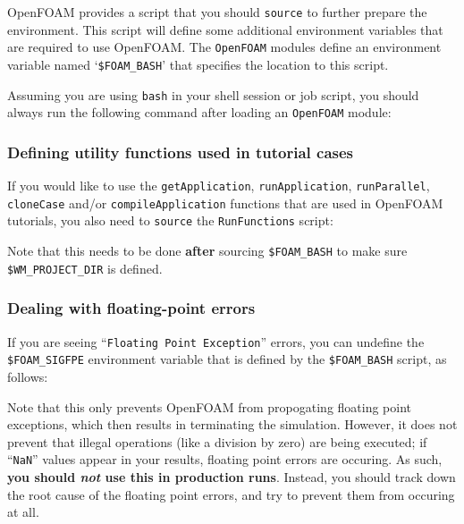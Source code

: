 OpenFOAM provides a script that you should \texttt{\small{source}} to further prepare the environment.
This script will define some additional environment variables that are required to use OpenFOAM.
The {\small\texttt{OpenFOAM}} modules define an environment variable named `\texttt{\small\$FOAM\_BASH}'
that specifies the location to this script.

Assuming you are using \texttt{\small{bash}} in your shell session or job script,
you should always run the following command after loading an \texttt{\small{OpenFOAM}} module:

\begin{prompt}
\end{prompt}


\subsubsection{Defining utility functions used in tutorial cases}

If you would like to use the \texttt{\small{getApplication}}, \texttt{\small{runApplication}},
\texttt{\small{runParallel}}, \texttt{\small{cloneCase}} and/or \texttt{\small{compileApplication}} functions that are
used in OpenFOAM tutorials, you also need to \texttt{\small{source}} the \texttt{\small{RunFunctions}} script:

\begin{prompt}
\end{prompt}

Note that this needs to be done \textbf{after} sourcing \texttt{\small{\$FOAM\_BASH}} to make sure
\texttt{\small{\$WM\_PROJECT\_DIR}} is defined.


\subsubsection{Dealing with floating-point errors}

If you are seeing ``\texttt{\small{Floating Point Exception}}'' errors, you can undefine the
\texttt{\small{\$FOAM\_SIGFPE}} environment variable that is defined by the \texttt{\small{\$FOAM\_BASH}} script,
as follows:

\begin{prompt}
\end{prompt}

Note that this only prevents OpenFOAM from propogating floating point exceptions, which then results in
terminating the simulation. However, it does not prevent that illegal operations (like a division by zero)
are being executed; if ``\texttt{\small{NaN}}'' values appear in your results, floating point errors are occuring.
As such, \textbf{you should \textit{not} use this in production runs}. Instead, you should track down the root cause
of the floating point errors, and try to prevent them from occuring at all.


